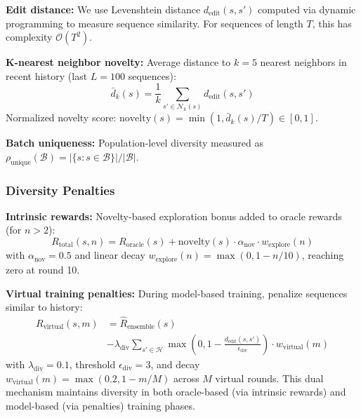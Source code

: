 \documentclass[conference]{IEEEtran}
\begin{document}
\textbf{Edit distance:} We use Levenshtein distance $d_{\text{edit}}(s, s')$ computed via dynamic programming to measure sequence similarity. For sequences of length $T$, this has complexity $\mathcal{O}(T^2)$.

\textbf{K-nearest neighbor novelty:} Average distance to $k=5$ nearest neighbors in recent history (last $L=100$ sequences):
%
\begin{equation}
\bar{d}_k(s) = \frac{1}{k}\sum_{s' \in \mathcal{N}_k(s)} d_{\text{edit}}(s, s')
\end{equation}
%
Normalized novelty score: $\text{novelty}(s) = \min(1, \bar{d}_k(s)/T) \in [0, 1]$.

\textbf{Batch uniqueness:} Population-level diversity measured as $\rho_{\text{unique}}(\mathcal{B}) = |\{s : s \in \mathcal{B}\}|/|\mathcal{B}|$.

\subsubsection{Diversity Penalties}

\textbf{Intrinsic rewards:} Novelty-based exploration bonus added to oracle rewards (for $n > 2$):
%
\begin{equation}
R_{\text{total}}(s, n) = R_{\text{oracle}}(s) + \text{novelty}(s) \cdot \alpha_{\text{nov}} \cdot w_{\text{explore}}(n)
\end{equation}
%
with $\alpha_{\text{nov}} = 0.5$ and linear decay $w_{\text{explore}}(n) = \max(0, 1 - n/10)$, reaching zero at round 10.

\textbf{Virtual training penalties:} During model-based training, penalize sequences similar to history:
%
\begin{equation}
\begin{split}
R_{\text{virtual}}(s, m) &= \hat{R}_{\text{ensemble}}(s) \\
&- \lambda_{\text{div}} \sum_{s' \in \mathcal{H}} \max\left(0, 1 - \frac{d_{\text{edit}}(s, s')}{\epsilon_{\text{div}}}\right) \cdot w_{\text{virtual}}(m)
\end{split}
\end{equation}
%
with $\lambda_{\text{div}} = 0.1$, threshold $\epsilon_{\text{div}} = 3$, and decay $w_{\text{virtual}}(m) = \max(0.2, 1 - m/M)$ across $M$ virtual rounds. This dual mechanism maintains diversity in both oracle-based (via intrinsic rewards) and model-based (via penalties) training phases.
\end{document}

